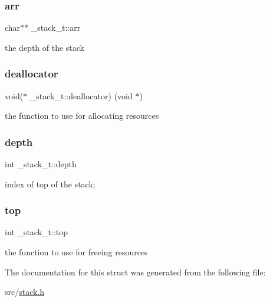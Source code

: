 \hypertarget{struct__stack__t_a99f4c0f7e39c7c0800b05683c6fa9b40}{}\label{struct__stack__t_a99f4c0f7e39c7c0800b05683c6fa9b40} 
\subsubsection{\texorpdfstring{arr}{arr}}
{\footnotesize\ttfamily char$\ast$$\ast$ \+\_\+stack\+\_\+t\+::arr}



the depth of the stack 

\hypertarget{struct__stack__t_a118ea389fe533015238144af0d9592dd}{}\label{struct__stack__t_a118ea389fe533015238144af0d9592dd} 
\subsubsection{\texorpdfstring{deallocator}{deallocator}}
{\footnotesize\ttfamily void($\ast$ \+\_\+stack\+\_\+t\+::deallocator) (void $\ast$)}

the function to use for allocating resources \hypertarget{struct__stack__t_abaaeb4c7879a01ef4aca7739ae59e947}{}\label{struct__stack__t_abaaeb4c7879a01ef4aca7739ae59e947} 
\subsubsection{\texorpdfstring{depth}{depth}}
{\footnotesize\ttfamily int \+\_\+stack\+\_\+t\+::depth}



index of top of the stack; 

\hypertarget{struct__stack__t_a150cee08557f9cb5d7defa6dce0ad879}{}\label{struct__stack__t_a150cee08557f9cb5d7defa6dce0ad879} 
\subsubsection{\texorpdfstring{top}{top}}
{\footnotesize\ttfamily int \+\_\+stack\+\_\+t\+::top}



the function to use for freeing resources 



The documentation for this struct was generated from the following file\+:\begin{DoxyCompactItemize}
\item 
src/\hyperlink{stack_8h}{stack.\+h}\end{DoxyCompactItemize}

